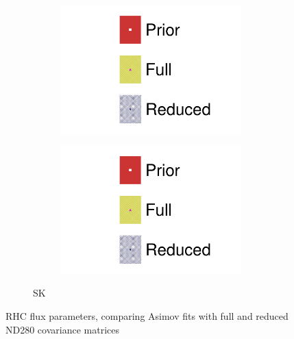 \begin{figure}[h]
\begin{subfigure}[t]{\textwidth}
\begin{subfigure}[t]{0.24\textwidth}
		\includegraphics[width=\textwidth,page=16, trim={0mm 0mm 0mm 9mm}, clip]{figures/mach3/2018/asimov/2018a_FixedCov_FullCov_Mpi_Asimov_merg_2018a_FixedCov_RedCov_Mpi_Asimov_merge}
	\end{subfigure}
	\begin{subfigure}[t]{0.24\textwidth}
		\includegraphics[width=\textwidth,page=17, trim={0mm 0mm 0mm 9mm}, clip]{figures/mach3/2018/asimov/2018a_FixedCov_FullCov_Mpi_Asimov_merg_2018a_FixedCov_RedCov_Mpi_Asimov_merge}
	\end{subfigure}
\caption{SK}
\end{subfigure}
	\caption{RHC flux parameters, comparing Asimov fits with full and reduced ND280 covariance matrices}
	\label{fig:asimov_fit_2018_full_red_beam_rhc}
\end{figure}

